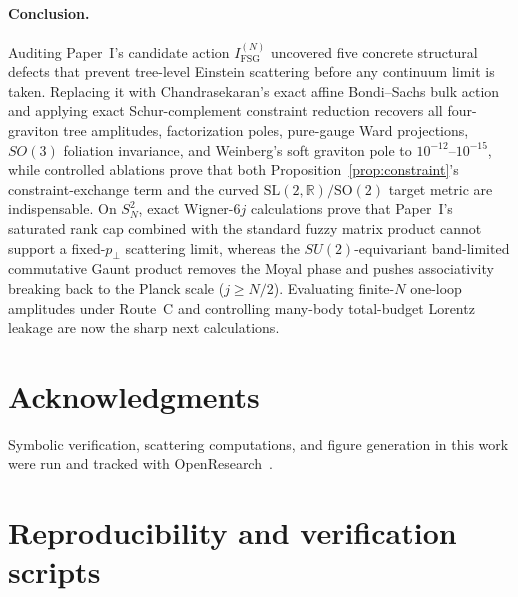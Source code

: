 \documentclass[11pt]{article}
\begin{document}
\paragraph{Conclusion.} Auditing Paper~I's candidate action $I_{\mathrm{FSG}}^{(N)}$ uncovered five concrete structural defects that prevent tree-level Einstein scattering before any continuum limit is taken. Replacing it with Chandrasekaran's exact affine Bondi--Sachs bulk action and applying exact Schur-complement constraint reduction recovers all four-graviton tree amplitudes, factorization poles, pure-gauge Ward projections, $SO(3)$ foliation invariance, and Weinberg's soft graviton pole to $10^{-12}\text{--}10^{-15}$, while controlled ablations prove that both Proposition~\ref{prop:constraint}'s constraint-exchange term and the curved $\mathrm{SL}(2,\mathbb{R})/\mathrm{SO}(2)$ target metric are indispensable. On $S^2_N$, exact Wigner-$6j$ calculations prove that Paper~I's saturated rank cap combined with the standard fuzzy matrix product cannot support a fixed-$p_\perp$ scattering limit, whereas the $SU(2)$-equivariant band-limited commutative Gaunt product removes the Moyal phase and pushes associativity breaking back to the Planck scale ($j \ge N/2$). Evaluating finite-$N$ one-loop amplitudes under Route~C and controlling many-body total-budget Lorentz leakage are now the sharp next calculations.

\section*{Acknowledgments}
Symbolic verification, scattering computations, and figure generation in this work were run and tracked with OpenResearch~\cite{openresearch}.

\appendix

\section{Reproducibility and verification scripts}\label{app:repro}
\end{document}
